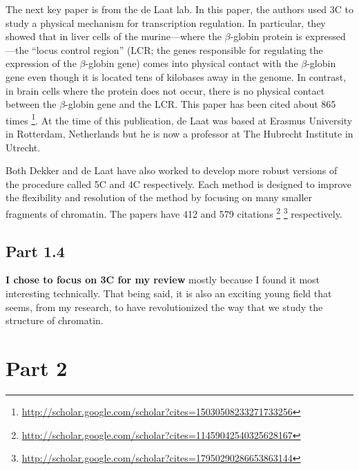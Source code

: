\documentclass[12pt]{article}
\begin{document}
The next key paper \cite{looping} is from the de Laat lab.
In this paper, the authors used 3C to study a physical mechanism for
transcription regulation.
In particular, they showed that in liver cells of the murine---where the
$\beta$-globin protein is expressed---the ``locus control region'' (LCR; the
genes responsible for regulating the expression of the $\beta$-globin gene)
comes into physical contact with the $\beta$-globin gene even though it is
located tens of kilobases away in the genome.
In contrast, in brain cells where the protein does not occur, there is no
physical contact between the $\beta$-globin gene and the LCR.
This paper has been cited about 865 times%
\footnote{\url{http://scholar.google.com/scholar?cites=15030508233271733256}}.
At the time of this publication, de Laat was based at Erasmus University in
Rotterdam, Netherlands but he is now a professor at The Hubrecht Institute in
Utrecht.

Both Dekker \cite{5c} and de Laat \cite{4c} have also worked to develop more
robust versions of the procedure called 5C and 4C respectively.
Each method is designed to improve the flexibility and resolution of the
method by focusing on many smaller fragments of chromatin.
The papers have 412 and 579 citations%
\footnote{\url{http://scholar.google.com/scholar?cites=11459042540325628167}}%
\footnote{\url{http://scholar.google.com/scholar?cites=17950290286653863144}}
respectively.

\subsection*{Part 1.4}

{\bf I chose to focus on 3C for my review} mostly because I found it most
interesting technically.
That being said, it is also an exciting young field that seems, from my
research, to have revolutionized the way that we study the structure of
chromatin.

\newpage

\section*{Part 2}



{}

\end{document}
